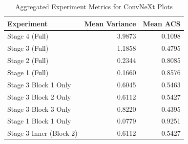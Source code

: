 \begin{table}
\caption{Aggregated Experiment Metrics for ConvNeXt Plots}
\label{tab:exp_plot_data_convnext}
\begin{tabular}{lrr}
\toprule
Experiment & Mean Variance & Mean ACS \\
\midrule
Stage 4 (Full) & 3.9873 & 0.1098 \\
Stage 3 (Full) & 1.1858 & 0.4795 \\
Stage 2 (Full) & 0.2344 & 0.8085 \\
Stage 1 (Full) & 0.1660 & 0.8576 \\
Stage 3 Block 1 Only & 0.6045 & 0.5463 \\
Stage 3 Block 2 Only & 0.6112 & 0.5427 \\
Stage 3 Block 3 Only & 0.8220 & 0.4395 \\
Stage 1 Block 1 Only & 0.0779 & 0.9251 \\
Stage 3 Inner (Block 2) & 0.6112 & 0.5427 \\
\bottomrule
\end{tabular}
\end{table}
